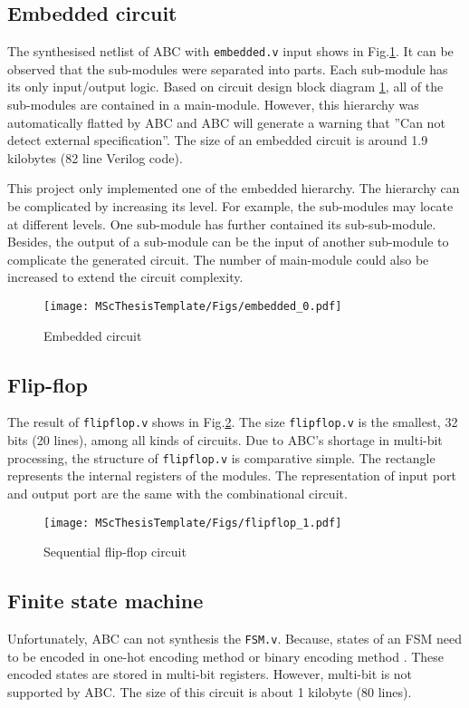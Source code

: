 \subsection{Embedded circuit}
The synthesised netlist of ABC with \texttt{embedded.v} input shows in Fig.\ref{fig:embedded}. It can be observed that the sub-modules were separated into parts. Each sub-module has its only input/output logic. Based on circuit design block diagram \ref{fig:embedded}, all of the sub-modules are contained in a main-module. However, this hierarchy was automatically flatted by ABC and ABC will generate a warning that ''Can not detect external specification''. The size of an embedded circuit is around 1.9 kilobytes (82 line Verilog code).

This project only implemented one of the embedded hierarchy. The hierarchy can be complicated by increasing its level. For example, the sub-modules may locate at different levels. One sub-module has further contained its sub-sub-module. Besides, the output of a sub-module can be the input of another sub-module to complicate the generated circuit. The number of main-module could also be increased to extend the circuit complexity.

\begin{figure}[htb]
    \centering
    \texttt{[image: MScThesisTemplate/Figs/embedded\_0.pdf]}
    \caption{\footnotesize Embedded circuit}
    \label{fig:embedded}
\end{figure}

\subsection{Flip-flop}
The result of \texttt{flipflop.v} shows in Fig.\ref{fig:flipflop}. The size \texttt{flipflop.v} is the smallest, 32 bits (20 lines), among all kinds of circuits. Due to ABC's shortage in multi-bit processing, the structure of \texttt{flipflop.v} is comparative simple.  The rectangle represents the internal registers of the modules. The representation of input port and output port are the same with the combinational circuit.
\begin{figure}[htb]
    \centering
    \texttt{[image: MScThesisTemplate/Figs/flipflop\_1.pdf]}
    \caption{ \footnotesize Sequential flip-flop circuit}
    \label{fig:flipflop}
\end{figure}

\subsection{Finite state machine}
Unfortunately, ABC can not synthesis the \texttt{FSM.v}. Because, states of an FSM need to be encoded in one-hot encoding method or binary encoding method \cite{golson1994state, harris2015digital}. These encoded states are stored in multi-bit registers. However, multi-bit is not supported by ABC. The size of this circuit is about 1 kilobyte (80 lines).

